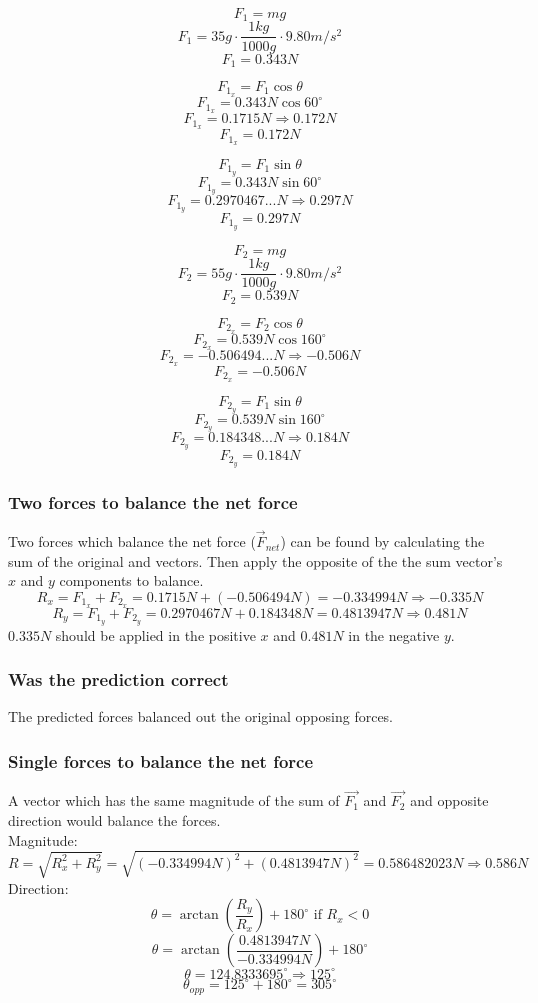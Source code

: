 \documentclass[11pt, letterpaper, includehead]{article}
\begin{document}
\begin{multicols}{2}
  $$F_1 = mg$$
  $$F_1 = 35g \cdot \frac{1kg}{1000g} \cdot 9.80m/s^2$$
  $$F_1 = 0.343N$$

  $$F_{1_x} = F_1\cos\theta$$
  $$F_{1_x} = 0.343N\cos60^{\circ}$$
  $$F_{1_x} = 0.1715N \Rightarrow 0.172N$$
  $$\boxed{F_{1_x} = 0.172N}$$

  $$F_{1_y} = F_1\sin\theta$$
  $$F_{1_y} = 0.343N\sin60^{\circ}$$
  $$F_{1_y} = 0.2970467...N \Rightarrow 0.297N$$
  $$\boxed{F_{1_y} = 0.297N}$$

  \columnbreak
  $$F_2 = mg$$
  $$F_2 = 55g \cdot \frac{1kg}{1000g} \cdot 9.80m/s^2$$
  $$F_2 = 0.539N$$

  $$F_{2_x} = F_2\cos\theta$$
  $$F_{2_x} = 0.539N\cos160^{\circ}$$
  $$F_{2_x} = -0.506494...N \Rightarrow -0.506N$$
  $$\boxed{F_{2_x} = -0.506N}$$

  $$F_{2_y} = F_1\sin\theta$$
  $$F_{2_y} = 0.539N\sin160^{\circ}$$
  $$F_{2_y} = 0.184348...N \Rightarrow 0.184N$$
  $$\boxed{F_{2_y} = 0.184N}$$
\end{multicols}

\subsubsection{Two forces to balance the net force} %
Two forces which balance the net force ($\vec{F}_{net}$) can be found by calculating the sum of 
the original and vectors. Then apply the opposite of the the sum vector's $x$ and $y$ components to balance.
$$R_x = F_{1_x} + F_{2_x} = 0.1715N + (-0.506494N) = -0.334994N \Rightarrow \boxed{-0.335N}$$
$$R_y = F_{1_y} + F_{2_y} = 0.2970467N + 0.184348N = 0.4813947N \Rightarrow \boxed{0.481N}$$
$0.335N$ should be applied in the positive $x$ and $0.481N$ in the negative $y$.

\subsubsection{Was the prediction correct} %
The predicted forces balanced out the original opposing forces. 

\subsubsection{Single forces to balance the net force} %
A vector which has the same magnitude of the sum of $\vec{F_1}$ and $\vec{F_2}$ 
and opposite direction would balance the forces.\\
Magnitude:
$$R = \sqrt{R_x^2 + R_y^2} = \sqrt{(-0.334994N)^2 + (0.4813947N)^2} = 0.586482023N \Rightarrow \boxed{0.586N}$$
Direction:
$$\theta = \arctan \left( \frac{R_y}{R_x} \right) + 180^{\circ} \text{ if } R_x < 0$$
$$\theta = \arctan \left( \frac{0.4813947N}{-0.334994N} \right) + 180^{\circ}$$
$$\theta = 124.8333695^{\circ} \Rightarrow {125^{\circ}}$$
$$\theta_{opp} = 125^{\circ} + 180^{\circ} = \boxed{305^{\circ}}$$
\end{document}
